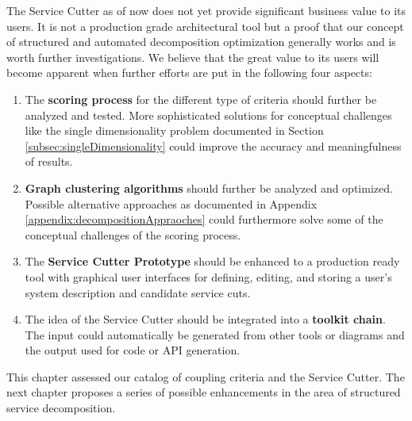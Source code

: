 The Service Cutter as of now does not yet provide significant business value to its users. It is not a production grade architectural tool but a proof that our concept of structured and automated decomposition optimization generally works and is worth further investigations. We believe that the great value to its users will become apparent when further efforts are put in the following four aspects:

\begin{enumerate}
	\item The \textbf{scoring process} for the different type of criteria should further be analyzed and tested. More sophisticated solutions for conceptual challenges like the single dimensionality problem documented in Section \ref{subsec:singleDimensionality} could improve the accuracy and meaningfulness of results. 
	\item \textbf{Graph clustering algorithms} should further be analyzed and optimized. Possible alternative approaches as documented in Appendix \ref{appendix:decompositionAppraoches} could furthermore solve some of the conceptual challenges of the scoring process.
	\item The \textbf{Service Cutter Prototype} should be enhanced to a production ready tool with graphical user interfaces for defining, editing, and storing a user's system description and candidate service cuts. %
	\item The idea of the Service Cutter should be integrated into a \textbf{toolkit chain}. The input could automatically be generated from other tools or diagrams and the output used for code or \gls{API} generation.
\end{enumerate}

\bigskip
This chapter assessed our catalog of coupling criteria and the Service Cutter. The next chapter proposes a series of possible enhancements in the area of structured service decomposition.
